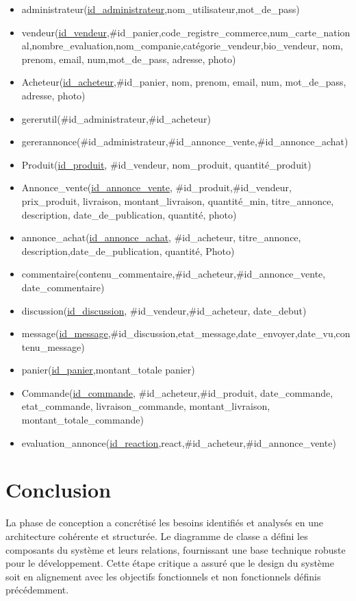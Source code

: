 \documentclass[edit,12pt,a4paper,ChapStyle,oneside,doubleinterligne]{report}
\begin{document}
\begin{itemize}
    \item administrateur(\underline{id\_administrateur},nom\_utilisateur,mot\_de\_pass)
    \item vendeur(\underline{id\_vendeur},\#id\_panier,code\_registre\_commerce,num\_carte\_national,\newline nombre\_evaluation,nom\_companie,catégorie\_vendeur,bio\_vendeur, nom, prenom, email, num,mot\_de\_pass, adresse, photo)
    \item Acheteur(\underline{id\_acheteur},\#id\_panier, nom, prenom, email, num, mot\_de\_pass, adresse, photo)
    \item gererutil(\#id\_administrateur,\#id\_acheteur)
    \item gererannonce(\#id\_administrateur,\#id\_annonce\_vente,\#id\_annonce\_achat)
    \item Produit(\underline{id\_produit}, \#id\_vendeur, nom\_produit, quantité\_produit)
    \item Annonce\_vente(\underline{id\_annonce\_vente}, \#id\_produit,\#id\_vendeur, prix\_produit, livraison, montant\_livraison, quantité\_min, titre\_annonce, description, date\_de\_publication, quantité, photo)
    \item annonce\_achat(\underline{id\_annonce\_achat}, \#id\_acheteur, titre\_annonce, description,\newline date\_de\_publication, quantité, Photo)
    \item commentaire(contenu\_commentaire,\#id\_acheteur,\#id\_annonce\_vente, date\_commentaire)
    \item discussion(\underline{id\_discussion}, \#id\_vendeur,\#id\_acheteur, date\_debut)
    \item message(\underline{id\_message},\#id\_discussion,etat\_message,date\_envoyer,date\_vu,contenu\_message)
    \item panier(\underline{id\_panier},montant\_totale panier)
    \item Commande(\underline{id\_commande}, \#id\_acheteur,\#id\_produit, date\_commande, etat\_commande, livraison\_commande, montant\_livraison, montant\_totale\_commande)
    \item evaluation\_annonce(\underline{id\_reaction},react,\#id\_acheteur,\#id\_annonce\_vente)
\end{itemize}
\section{Conclusion}
La phase de conception a concrétisé les besoins identifiés et analysés en une architecture cohérente et structurée. Le diagramme de classe a défini les composants du système et leurs relations, fournissant une base technique robuste pour le développement. Cette étape critique a assuré que le design du système soit en alignement avec les objectifs fonctionnels et non fonctionnels définis précédemment.
\end{document}

